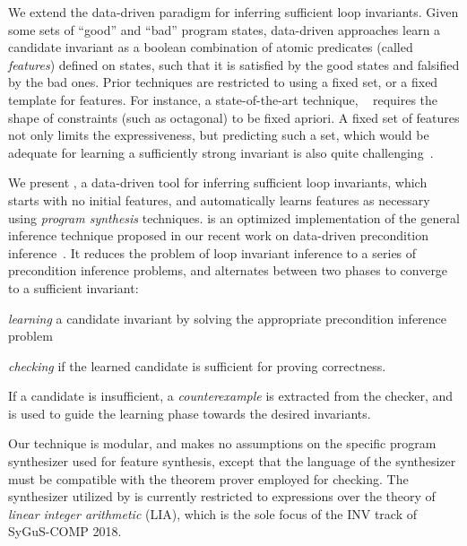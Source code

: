 \documentclass[conference]{IEEEtran}
\begin{document}
We extend the data-driven paradigm for inferring sufficient loop invariants.
Given some sets of ``good'' and ``bad'' program states,
data-driven approaches learn a candidate invariant as a boolean combination of atomic predicates (called \emph{features})
defined on states, such that it is satisfied by the good states and falsified by the bad ones.
Prior techniques are restricted to using a fixed set, or a fixed template for features.
For instance, a state-of-the-art technique, \ICEDT~\cite{Garg2016LearningIU}
requires the shape of constraints (such as octagonal) to be fixed apriori.
A fixed set of features not only limits the expressiveness, but predicting such a set,
which would be adequate for learning a sufficiently strong invariant is also quite challenging~\cite{Padhi2016DatadrivenPI}.

We present \LoopInvGen, a data-driven tool for inferring sufficient loop invariants,
which starts with no initial features, and automatically learns features as necessary using \emph{program synthesis} techniques.
\LoopInvGen is an optimized implementation of the general inference technique proposed in our recent work
on data-driven precondition inference~\cite{Padhi2016DatadrivenPI}.
It reduces the problem of loop invariant inference to a series of precondition inference problems,
and alternates between two phases to converge to a sufficient invariant:
\begin{andlist}
    \item \emph{learning} a candidate invariant by solving the appropriate precondition inference problem
    \item \emph{checking} if the learned candidate is sufficient for proving correctness.
\end{andlist}
If a candidate is insufficient, a \emph{counterexample} is extracted from the checker,
and is used to guide the learning phase towards the desired invariants.



Our technique is modular, and makes no assumptions on the specific program synthesizer used for feature synthesis,
except that the language of the synthesizer must be compatible with the theorem prover employed for checking.
The synthesizer utilized by \LoopInvGen is currently restricted to expressions over the theory of
\emph{linear integer arithmetic} (LIA), which is the sole focus of the INV track of SyGuS-COMP 2018.
\end{document}

